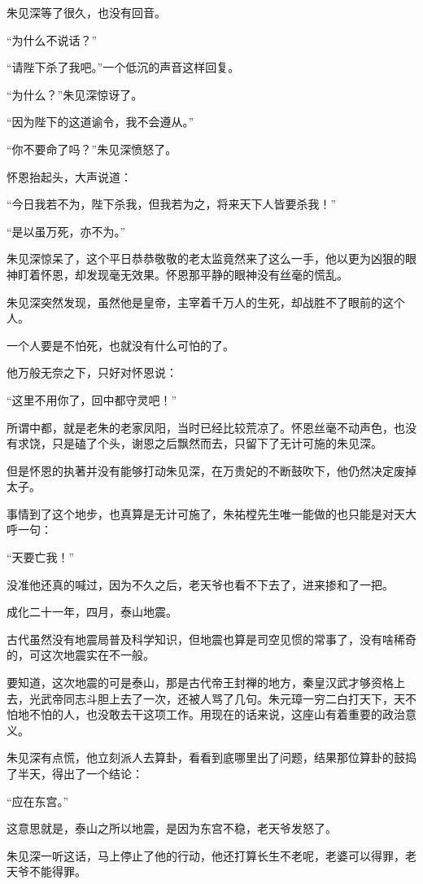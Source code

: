 \begin{multicols}{\theparacolNo}
朱见深等了很久，也没有回音。

“为什么不说话？”

“请陛下杀了我吧。”一个低沉的声音这样回复。

“为什么？”朱见深惊讶了。

“因为陛下的这道谕令，我不会遵从。”

“你不要命了吗？”朱见深愤怒了。

怀恩抬起头，大声说道：

“今日我若不为，陛下杀我，但我若为之，将来天下人皆要杀我！”

“是以虽万死，亦不为。”

朱见深惊呆了，这个平日恭恭敬敬的老太监竟然来了这么一手，他以更为凶狠的眼神盯着怀恩，却发现毫无效果。怀恩那平静的眼神没有丝毫的慌乱。

朱见深突然发现，虽然他是皇帝，主宰着千万人的生死，却战胜不了眼前的这个人。

一个人要是不怕死，也就没有什么可怕的了。

他万般无奈之下，只好对怀恩说：

“这里不用你了，回中都守灵吧！”

所谓中都，就是老朱的老家凤阳，当时已经比较荒凉了。怀恩丝毫不动声色，也没有求饶，只是磕了个头，谢恩之后飘然而去，只留下了无计可施的朱见深。

但是怀恩的执著并没有能够打动朱见深，在万贵妃的不断鼓吹下，他仍然决定废掉太子。

事情到了这个地步，也真算是无计可施了，朱祐樘先生唯一能做的也只能是对天大呼一句：

“天要亡我！”

没准他还真的喊过，因为不久之后，老天爷也看不下去了，进来掺和了一把。

成化二十一年，四月，泰山地震。

古代虽然没有地震局普及科学知识，但地震也算是司空见惯的常事了，没有啥稀奇的，可这次地震实在不一般。

要知道，这次地震的可是泰山，那是古代帝王封禅的地方，秦皇汉武才够资格上去，光武帝同志斗胆上去了一次，还被人骂了几句。朱元璋一穷二白打天下，天不怕地不怕的人，也没敢去干这项工作。用现在的话来说，这座山有着重要的政治意义。

朱见深有点慌，他立刻派人去算卦，看看到底哪里出了问题，结果那位算卦的鼓捣了半天，得出了一个结论：

“应在东宫。”

这意思就是，泰山之所以地震，是因为东宫不稳，老天爷发怒了。

朱见深一听这话，马上停止了他的行动，他还打算长生不老呢，老婆可以得罪，老天爷不能得罪。


\end{multicols}
